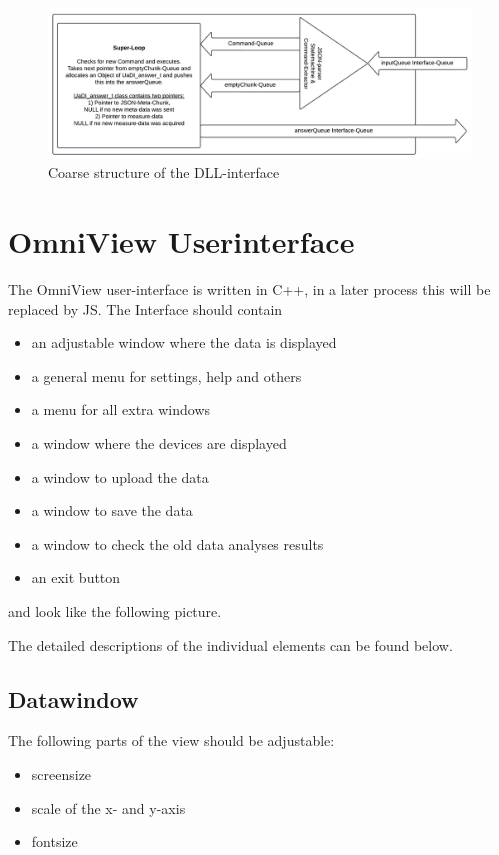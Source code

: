 \documentclass{scrreprt}
\begin{document}
\begin{figure}
    \includegraphics[width=.9\textwidth]{./assets/pictures/interface.pdf}
    \caption[]{Coarse structure of the DLL-interface}
    \label{fig:dllinterface}
\end{figure}




\section{OmniView Userinterface}

The OmniView user-interface is written in C++, in a later process this will be replaced by JS. The Interface should contain 

\begin{itemize}
    \item an adjustable window where the data is displayed
    \item a general menu for settings, help and others 
    \item a menu for all extra windows 
    \item a window where the devices are displayed
    \item a window to upload the data
    \item a window to save the data 
    \item a window to check the old data analyses results 
    \item an exit button
\end{itemize}

and look like the following picture. 

The detailed descriptions of the individual elements can be found below.

\subsection{Datawindow}

The following parts of the view should be adjustable: 

\begin{itemize}
    \item screensize
    \item scale of the x- and y-axis 
    \item fontsize 
\end{itemize}
\end{document}
